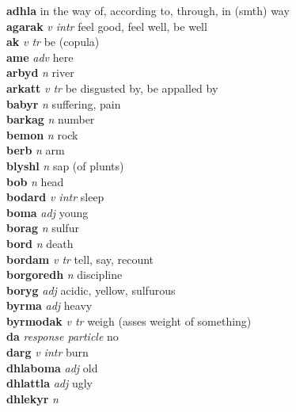 \textbf{adhla}    \textperiodcentered in the way of, according to, through, in (smth) way\\\textbf{agarak}   \emph{v intr} \textperiodcentered feel good, feel well, be well\\\textbf{ak}   \emph{v tr} \textperiodcentered be (copula)\\\textbf{ame}   \emph{adv} \textperiodcentered here\\\textbf{arbyd}   \emph{n} \textperiodcentered river\\\textbf{arkatt}   \emph{v tr} \textperiodcentered be disgusted by, be appalled by\\\textbf{babyr}   \emph{n} \textperiodcentered suffering, pain\\\textbf{barkag}   \emph{n} \textperiodcentered number\\\textbf{bemon}   \emph{n} \textperiodcentered rock\\\textbf{berb}   \emph{n} \textperiodcentered arm\\\textbf{blyshl}   \emph{n} \textperiodcentered sap (of plunts)\\\textbf{bob}   \emph{n} \textperiodcentered head\\\textbf{bodard}   \emph{v intr} \textperiodcentered sleep\\\textbf{boma}   \emph{adj} \textperiodcentered young\\\textbf{borag}   \emph{n} \textperiodcentered sulfur\\\textbf{bord}   \emph{n} \textperiodcentered death\\\textbf{bordam}   \emph{v tr} \textperiodcentered tell, say, recount\\\textbf{borgoredh}   \emph{n} \textperiodcentered discipline\\\textbf{boryg}   \emph{adj} \textperiodcentered acidic, yellow, sulfurous\\\textbf{byrma}   \emph{adj} \textperiodcentered heavy\\\textbf{byrmodak}   \emph{v tr} \textperiodcentered weigh (asses weight of something)\\\textbf{da}   \emph{response particle} \textperiodcentered no\\\textbf{darg}   \emph{v intr} \textperiodcentered burn\\\textbf{dhlaboma}   \emph{adj} \textperiodcentered old\\\textbf{dhlattla}   \emph{adj} \textperiodcentered ugly\\\textbf{dhlekyr}   \emph{n} \textperiodcentered 